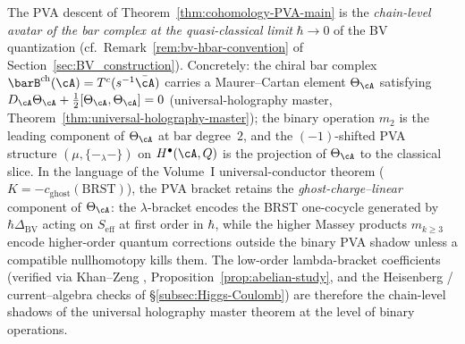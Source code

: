 \begin{remark}
\label{rem:pva-quasi-classical-bar-avatar}
The PVA descent of Theorem~\ref{thm:cohomology-PVA-main} is the
\emph{chain-level avatar of the bar complex at the quasi-classical
limit} $\hbar \to 0$ of the BV quantization (cf.\ Remark~\ref{rem:bv-hbar-convention}
of Section~\ref{sec:BV_construction}). Concretely: the chiral bar complex
$\barB^{\mathrm{ch}}(\cA) = T^c(s^{-1}\bar\cA)$ carries a Maurer--Cartan
element $\Theta_\cA$ satisfying $D_\cA\Theta_\cA + \tfrac12[\Theta_\cA,\Theta_\cA] = 0$
(universal-holography master, Theorem~\ref{thm:universal-holography-master});
the binary operation $m_2$ is the leading component of $\Theta_\cA$ at bar
degree~$2$, and the $(-1)$-shifted PVA structure $(\mu, \{-_\lambda-\})$
on $H^\bullet(\cA,Q)$ is the projection of $\Theta_\cA$ to the classical
slice. In the language of the Volume~I universal-conductor theorem
($K = -c_{\mathrm{ghost}}(\mathrm{BRST})$), the PVA bracket retains the
\emph{ghost-charge--linear} component of $\Theta_\cA$: the $\lambda$-bracket
encodes the BRST one-cocycle generated by $\hbar\Delta_{\mathrm{BV}}$ acting
on $S_{\mathrm{eff}}$ at first order in $\hbar$, while the higher Massey
products $m_{k \ge 3}$ encode higher-order quantum corrections outside
the binary PVA shadow unless a compatible nullhomotopy kills them. The
low-order lambda-bracket coefficients
(verified via Khan--Zeng \cite{KZ25}, Proposition~\ref{prop:abelian-study},
and the Heisenberg / current--algebra checks of \S\ref{subsec:Higgs-Coulomb})
are therefore the chain-level shadows of the universal holography master
theorem at the level of binary operations.
\end{remark}

